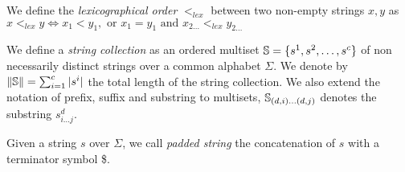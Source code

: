 
\begin{definition}
\label{def:lex}
We define the \emph{lexicographical order} $<_{lex}$ between two non-empty strings $x,y$ as $x <_{lex} y \iff x_1 < y_1, \text{ or } x_1 = y_1 \text{ and } x_{2 \dots} <_{lex} y_{2 \dots}$
\end{definition}

\begin{definition}
\label{def:colt}
We define a \emph{string collection} as an ordered multiset $\mathbb {S} = \{ s^1, s^2, \dots, s^c \}$ of non necessarily distinct strings over a common alphabet $\Sigma$.
We denote by $\left\lVert\mathbb {S}\right\rVert=\sum_{i=1}^{c}{|s^i|}$ the total length of the string collection.
We also extend the notation of prefix, suffix and substring to multisets, \eg $\mathbb {S}_{(d,i) \dots (d,j)}$ denotes the substring $s^d_{i \dots j}$.
\end{definition}


\begin{definition}
\label{def:strd}
Given a string $s$ over $\Sigma$, we call \emph{padded string} the concatenation of $s$ with a terminator symbol \$.
\end{definition}



